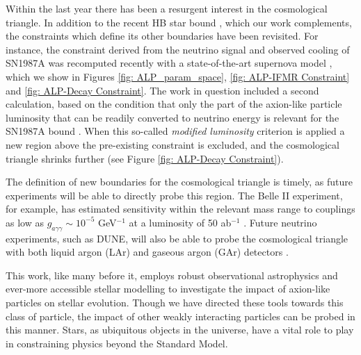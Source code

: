 Within the last year there has been a resurgent interest in the cosmological triangle. In addition to the recent HB star bound \cite{Carenza:2020zil}, which our work complements, the constraints which define its other boundaries have been revisited. For instance, the constraint derived from the neutrino signal and observed cooling of SN1987A was recomputed recently with a state-of-the-art supernova model \cite{Lucente:2020whw}, which we show in Figures \ref{fig: ALP_param_space}, \ref{fig: ALP-IFMR Constraint} and \ref{fig: ALP-Decay Constraint}. The work in question included a second calculation, based on the condition that only the part of the axion-like particle luminosity that can be readily converted to neutrino energy is relevant for the SN1987A bound \cite{Chang:2016ntp, Ertas:2020xcc}. When this so-called \textit{modified luminosity} criterion is applied a new region above the pre-existing constraint is excluded, and the cosmological triangle shrinks further (see Figure \ref{fig: ALP-Decay Constraint}). 




The definition of new boundaries for the cosmological triangle is timely, as future experiments will be able to directly probe this region. The Belle II experiment, for example, has estimated sensitivity within the relevant mass range to couplings as low as $g_{a\gamma\gamma}\sim10^{-5}$ GeV$^{-1}$ at a luminosity of 50 ab$^{-1}$ \cite{Dolan:2017osp}. Future neutrino experiments, such as DUNE, will also be able to probe the cosmological triangle with both liquid argon (LAr) and gaseous argon (GAr) detectors \cite{Brdar:2020dpr}.




This work, like many before it, employs robust observational astrophysics and ever-more accessible stellar modelling to investigate the impact of axion-like particles on stellar evolution. Though we have directed these tools towards this class of particle, the impact of other weakly interacting particles can be probed in this manner. Stars, as ubiquitous objects in the universe, have a vital role to play in constraining physics beyond the Standard Model.